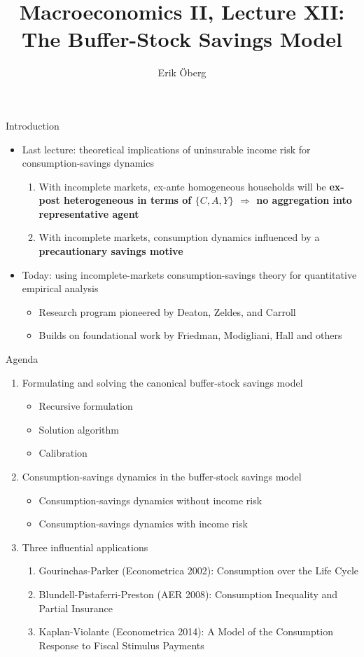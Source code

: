 \documentclass[9pt]{beamer}
\title[The Buffer-Stock Savings Model]{\large Macroeconomics II, Lecture XII:\\
		The Buffer-Stock Savings Model}
\author{Erik {\"O}berg}
\date{}
\newcommand{\bit}{\begin{itemize}}
\newcommand{\eit}{\end{itemize}}
\newcommand{\ben}{\begin{enumerate}}
\newcommand{\een}{\end{enumerate}}
\begin{document}
\begin{frame}
\vspace*{-1.5em}
\titlepage
\end{frame}

\begin{frame}{Introduction}

\bit
\setlength\itemsep{2em}

\item Last lecture: theoretical implications of uninsurable income risk for consumption-savings dynamics
\ben
\setlength\itemsep{1em}
\item With incomplete markets, ex-ante homogeneous households will be \bf ex-post heterogeneous \normalfont in terms of $\{C,A,Y\}$ $\Rightarrow$ no aggregation into representative agent

\item With incomplete markets, consumption dynamics influenced by a \bf precautionary savings \normalfont motive
\een

\item Today: using incomplete-markets consumption-savings theory for quantitative empirical analysis
\bit
\setlength\itemsep{0.3em}
	\item Research program pioneered by Deaton, Zeldes, and Carroll 
	
	\item Builds on foundational work by Friedman, Modigliani, Hall and others
\eit

\eit

\end{frame}


\begin{frame}{Agenda}

\ben
\setlength\itemsep{1.5em}

\item Formulating and solving the canonical buffer-stock savings model
\bit
\setlength\itemsep{0.5em}
	\item Recursive formulation
	\item Solution algorithm
	\item Calibration
\eit

\item Consumption-savings dynamics in the buffer-stock savings model
\bit
\setlength\itemsep{0.5em}
	\item Consumption-savings dynamics without income risk
	\item Consumption-savings dynamics with income risk
\eit

\item Three influential applications
\ben
\setlength\itemsep{0.5em}
	\item Gourinchas-Parker (Econometrica 2002): Consumption over the Life Cycle

	\item Blundell-Pistaferri-Preston (AER 2008): Consumption Inequality and Partial Insurance

	\item Kaplan-Violante (Econometrica 2014): A Model of the Consumption Response to Fiscal Stimulus Payments
\een

\een

\end{frame}
\end{document}
